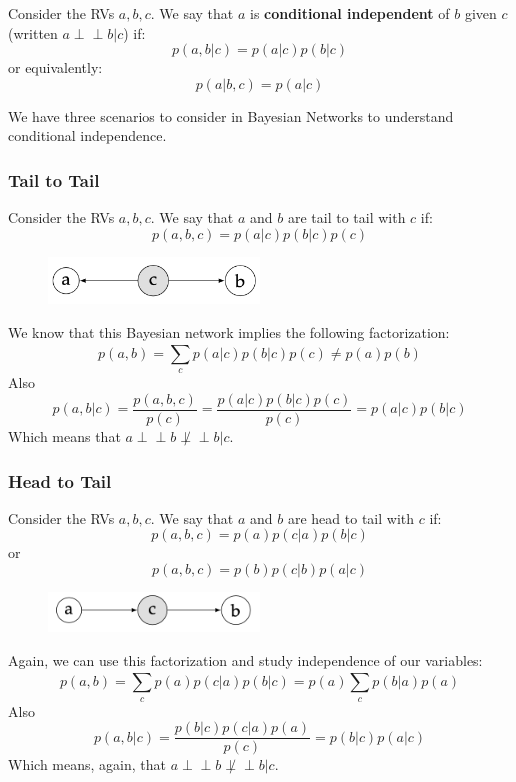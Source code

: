 \begin{definitionblock}
    Consider the RVs $a, b, c$. We say that $a$ is \textbf{conditional independent} of $b$ given $c$ (written $a \perp \!\!\! \perp b | c$) if:
    \[
        p(a,b|c) = p(a|c)p(b|c)
    \]
    or equivalently:
    \[
        p(a|b,c) = p(a|c)
    \]
\end{definitionblock}

We have three scenarios to consider in Bayesian Networks to understand conditional independence.

\subsubsection{Tail to Tail}

Consider the RVs $a, b, c$. We say that $a$ and $b$ are tail to tail with $c$ if:
\[
    p(a, b, c) = p(a|c)p(b|c)p(c)
\]
\begin{figure}[H]
    \centering
    \includegraphics[width=0.5\textwidth]{assets/fig14.png}
\end{figure}

We know that this Bayesian network implies the following factorization:
\[
    p(a,b) = \sum_{c}^{}p(a|c)p(b|c)p(c) \neq p(a)p(b)
\]
Also 
\[
    p(a,b|c) = \frac{p(a,b,c)}{p(c)} = \frac{p(a|c)p(b|c)p(c)}{p(c)} = p(a|c)p(b|c)
\]
Which means that $a \perp \!\!\! \perp b \not \perp \!\!\! \perp b | c$.

\subsubsection{Head to Tail}

Consider the RVs $a, b, c$. We say that $a$ and $b$ are head to tail with $c$ if:
\[
    p(a, b, c) = p(a)p(c|a)p(b|c)
\]
or 
\[
    p(a, b, c) = p(b)p(c|b)p(a|c)
\]

\begin{figure}[H]
    \centering
    \includegraphics[width=0.5\textwidth]{assets/fig15.png}
\end{figure}

Again, we can use this factorization and study independence of our variables:
\[
    p(a,b) = \sum_{c}^{}p(a)p(c|a)p(b|c) = p(a)\sum_{c}^{}p(b|a)p(a)
\]
Also 
\[
    p(a,b|c) = \frac{p(b|c)p(c|a)p(a)}{p(c)} = p(b|c)p(a|c)
\]
Which means, again, that $a \perp \!\!\! \perp b \not \perp \!\!\! \perp b | c$.

